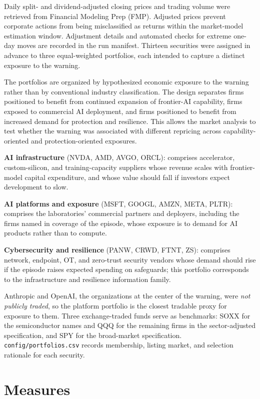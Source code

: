 \elsevierclasstrue\documentclass[preprint,12pt]{elsarticle}%
\begin{document}
Daily split- and dividend-adjusted closing prices and trading volume were retrieved from Financial Modeling Prep (FMP). Adjusted prices prevent corporate actions from being misclassified as returns within the market-model estimation window. Adjustment details and automated checks for extreme one-day moves are recorded in the run manifest.
Thirteen securities were assigned in advance to three equal-weighted portfolios, each intended to capture a distinct exposure to the warning. 

The portfolios are organized by hypothesized economic exposure to the warning rather than by conventional industry classification. The design separates firms positioned to benefit from continued expansion of frontier-AI capability, firms exposed to commercial AI deployment, and firms positioned to benefit from increased demand for protection and resilience. This allows the market analysis to test whether the warning was associated with different repricing across capability-oriented and protection-oriented exposures.

\textbf{AI infrastructure} (NVDA, AMD, AVGO, ORCL): comprises accelerator, custom-silicon, and training-capacity suppliers whose revenue scales with frontier-model capital expenditure, and whose value should fall if investors expect development to slow. 

\textbf{AI platforms and exposure} (MSFT, GOOGL, AMZN, META, PLTR): comprises the laboratories' commercial partners and deployers, including the firms named in coverage of the episode, whose exposure is to demand for AI products rather than to compute. 

\textbf{Cybersecurity and resilience} (PANW, CRWD, FTNT, ZS): comprises network, endpoint, OT, and zero-trust security vendors whose demand should rise if the episode raises expected spending on safeguards; this portfolio corresponds to the infrastructure and resilience information family. 

Anthropic and OpenAI, the organizations at the center of the warning, were \textit{not publicly traded}, so the platform portfolio is the closest tradable proxy for exposure to them. Three exchange-traded funds serve as benchmarks: SOXX for the semiconductor names and QQQ for the remaining firms in the sector-adjusted specification, and SPY for the broad-market specification. \texttt{config/portfolios.csv} records membership, listing market, and selection rationale for each security.


\section{Measures}
\label{sec:measures}
\end{document}
